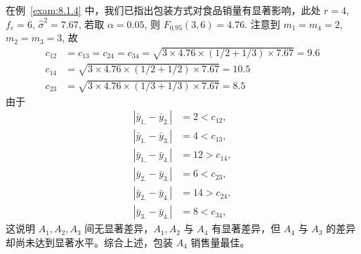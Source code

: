 \begin{example}\label{exam:8.2.3}
  在例~\ref{exam:8.1.4} 中，我们已指出包装方式对食品销量有显著影响，此处 $r=4$, $f_e = 6$, $\hat{\sigma}^2 = 7.67$, 若取 $\alpha = 0.05$, 则 $F_{0.95}(3,6) = 4.76$. 注意到 $m_1 = m_4 = 2$, $m_2=m_3=3$, 故
  \begin{align*} 
    c_{12} &=c_{13}=c_{24}=c_{34}=\sqrt{3 \times 4.76 \times(1 / 2+1 / 3) \times 7.67}=9.6 \\ 
    c_{14} &=\sqrt{3 \times 4.76 \times(1 / 2+1 / 2) \times 7.67}=10.5 \\ 
    c_{23} &=\sqrt{3 \times 4.76 \times(1 / 3+1 / 3) \times 7.67}=8.5 
  \end{align*}
  由于
  \begin{align*}
    \left|\bar{y}_{1.}-\bar{y}_{2.} \right| &=  2 < c_{12},\\
    \left|\bar{y}_{1.}-\bar{y}_{3.} \right| &=  4 < c_{13},\\
    \left|\bar{y}_{1.}-\bar{y}_{4.} \right| &= 12 > c_{14},\\
    \left|\bar{y}_{2.}-\bar{y}_{3.} \right| &=  6 < c_{23},\\
    \left|\bar{y}_{2.}-\bar{y}_{4.} \right| &= 14 > c_{24},\\
    \left|\bar{y}_{3.}-\bar{y}_{4.} \right| &=  8 < c_{34},   
  \end{align*}
这说明 $A_1, A_2, A_3$ 间无显著差异，$A_1, A_2$ 与 $A_4$ 有显著差异，但 $A_4$ 与 $A_3$ 的差异却尚未达到显著水平。综合上述，包装 $A_4$ 销售量最佳。
\end{example}

